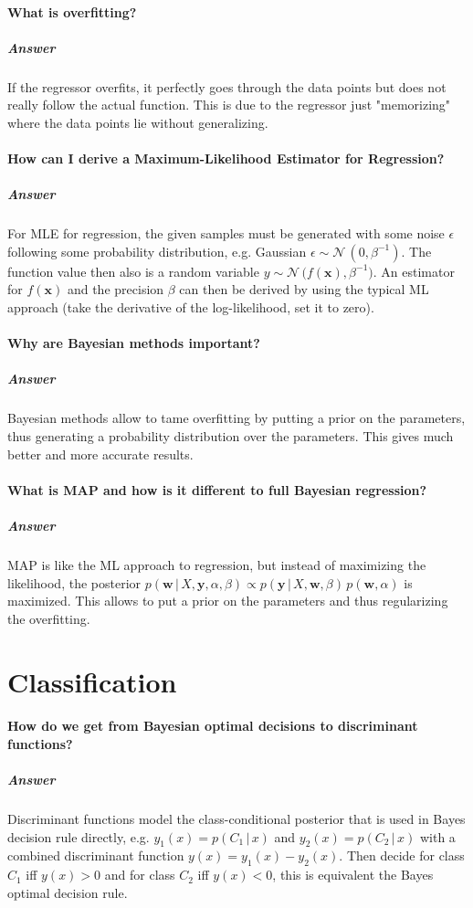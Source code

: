 \documentclass[a4paper, 11pt, accentcolor = tud3b]{tudreport}
\newcommand{\answer}[1]{\subparagraph{Answer} #1}
\newcommand{\given}{\ensuremath{\,\vert\,}}
\renewcommand{\vec}[1]{\mathbf{#1}}
\begin{document}
			\paragraph{What is overfitting?}
			\answer{If the regressor overfits, it perfectly goes through the data points but does not really follow the actual function. This is due to the regressor just "memorizing" where the data points lie without generalizing.}

			\paragraph{How can I derive a Maximum-Likelihood Estimator for Regression?}
			\answer{For MLE for regression, the given samples must be generated with some noise \( \epsilon \) following some probability distribution, e.g. Gaussian \( \epsilon \sim \mathcal{N}\,(0, \beta^{-1}) \). The function value then also is a random variable \( y \sim \mathcal{N}\,\big(f(\vec{x}), \beta^{-1}\big) \). An estimator for \( f(\vec{x}) \) and the precision \(\beta\) can then be derived by using the typical ML approach (take the derivative of the log-likelihood, set it to zero).}

			\paragraph{Why are Bayesian methods important?}
			\answer{Bayesian methods allow to tame overfitting by putting a prior on the parameters, thus generating a probability distribution over the parameters. This gives much better and more accurate results.}

			\paragraph{What is MAP and how is it different to full Bayesian regression?}
			\answer{MAP is like the ML approach to regression, but instead of maximizing the likelihood, the posterior \( p(\vec{w} \given X, \vec{y}, \alpha, \beta) \propto p(\vec{y} \given X, \vec{w}, \beta) \, p(\vec{w}, \alpha) \) is maximized. This allows to put a prior on the parameters and thus regularizing the overfitting.}

		\section{Classification}
			\paragraph{How do we get from Bayesian optimal decisions to discriminant functions?} %
			\answer{Discriminant functions model the class-conditional posterior that is used in Bayes decision rule directly, e.g. \( y_1(x) = p(C_1 \given x) \) and \( y_2(x) = p(C_2 \given x) \) with a combined discriminant function \( y(x) = y_1(x) - y_2(x) \). Then decide for class \(C_1\) iff \( y(x) > 0 \) and for class \( C_2 \) iff \( y(x) < 0 \), this is equivalent the Bayes optimal decision rule.}
\end{document}
